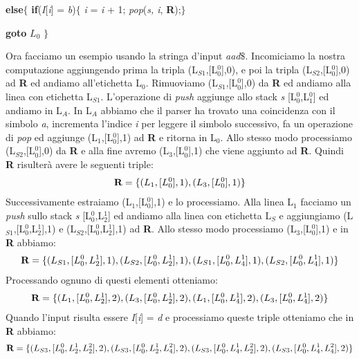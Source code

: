 \hspace{0.2cm} \textbf{else}$\{$ \textbf{if}(\textit{I}[\textit{i}] = \textit{b})$\{$ \textit{i} = \textit{i} + 1; \textit{pop}(\textit{s, i}, \textbf{R});$\}$ \par
\hspace{1.5cm}\textbf{goto} $L_0$ $\}$ \par 
\vspace{0.3cm}
Ora facciamo un esempio usando la stringa d'input \textit{aad}$\$$. Incomiciamo la nostra computazione aggiungendo prima la tripla (L$_{S1}$,[L$_0^{0}$],0), e poi la tripla (L$_{S2}$,[L$_0^{0}$],0) ad \textbf{R} ed andiamo all'etichetta L$_0$. Rimuoviamo (L$_{S1}$,[L$_0^{0}$],0) da \textbf{R} ed andiamo alla linea con etichetta L$_{S1}$. L'operazione di \textit{push} aggiunge allo stack \textit{s} [L$_0^{0}$,L$_1^{0}$] ed andiamo in L$_A$. In L$_A$ abbiamo che il parser ha trovato una coincidenza con il simbolo \textit{a}, incrementa l'indice \textit{i} per leggere il simbolo successivo, fa un operazione di \textit{pop} ed aggiunge  (L$_{1}$,[L$_0^{0}$],1) ad \textbf{R} e ritorna in L$_0$. Allo stesso modo processiamo  (L$_{S2}$,[L$_0^{0}$],0) da \textbf{R} e alla fine avremo (L$_{3}$,[L$_0^{0}$],1) che viene aggiunto ad \textbf{R}. Quindi \textbf{R} risulterà avere le seguenti triple:
\begin{align}
	\textbf{R} = \{ (L_1,[L_0^{0}],1), (L_3,[L_0^{0}],1) \} \notag
\end{align}
Successivamente estraiamo (L$_{1}$,[L$_0^{0}$],1) e lo processiamo. Alla linea L$_1$ facciamo un \textit{push} sullo stack \textit{s} [L$_0^{0}$,L$_2^{1}$] ed andiamo alla linea con etichetta L$_S$ e aggiungiamo (L$_{S1}$,[L$_0^{0}$,L$_2^{1}$],1) e (L$_{S2}$,[L$_0^{0}$,L$_2^{1}$],1) ad \textbf{R}. Allo stesso modo processiamo (L$_{3}$,[L$_0^{0}$],1) e in \textbf{R} abbiamo:
\begin{align}
	\textbf{R} = \{ (L_{S1},[L_0^{0},L_2^{1}],1), (L_{S2},[L_0^{0},L_2^{1}],1), (L_{S1},[L_0^{0},L_4^{1}],1), (L_{S2},[L_0^{0},L_4^{1}],1) \} \notag
\end{align}
Processando ognuno di questi elementi otteniamo:
\begin{align}
	\textbf{R} = \{ (L_{1},[L_0^{0},L_2^{1}],2), (L_{3},[L_0^{0},L_2^{1}],2), (L_{1},[L_0^{0},L_4^{1}],2),  (L_{3},[L_0^{0},L_4^{1}],2) \} \notag
\end{align}
Quando l'input risulta essere \textit{I}[\textit{i}] = \textit{d} e processiamo queste triple otteniamo che in \textbf{R} abbiamo:
\begin{align}
	\textbf{R} = \{ (L_{S3},[L_0^{0},L_2^{1},L_2^{2}],2), (L_{S3},[L_0^{0},L_2^{1},L_4^{2}],2),  (L_{S3},[L_0^{0},L_4^{1},L_2^{2}],2), (L_{S3},[L_0^{0},L_4^{1},L_4^{2}],2) \} \notag
\end{align}
